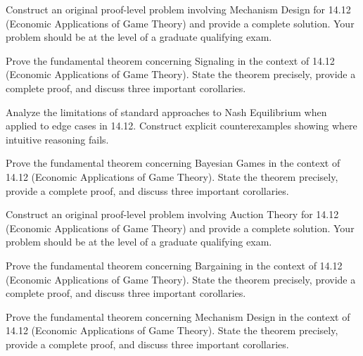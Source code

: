 \documentclass[12pt,a4paper]{exam}
\begin{document}
\begin{questions}
\vspace{0.3cm}

\question[3]
Construct an original proof-level problem involving Mechanism Design for 14.12 (Economic Applications of Game Theory) and provide a complete solution. Your problem should be at the level of a graduate qualifying exam.

\vspace{0.3cm}

\question[2]
Prove the fundamental theorem concerning Signaling in the context of 14.12 (Economic Applications of Game Theory). State the theorem precisely, provide a complete proof, and discuss three important corollaries.

\vspace{0.3cm}

\question[3]
Analyze the limitations of standard approaches to Nash Equilibrium when applied to edge cases in 14.12. Construct explicit counterexamples showing where intuitive reasoning fails.

\vspace{0.3cm}

\question[6]
Prove the fundamental theorem concerning Bayesian Games in the context of 14.12 (Economic Applications of Game Theory). State the theorem precisely, provide a complete proof, and discuss three important corollaries.

\vspace{0.3cm}

\question[5]
Construct an original proof-level problem involving Auction Theory for 14.12 (Economic Applications of Game Theory) and provide a complete solution. Your problem should be at the level of a graduate qualifying exam.

\vspace{0.3cm}

\question[5]
Prove the fundamental theorem concerning Bargaining in the context of 14.12 (Economic Applications of Game Theory). State the theorem precisely, provide a complete proof, and discuss three important corollaries.

\vspace{0.3cm}

\question[2]
Prove the fundamental theorem concerning Mechanism Design in the context of 14.12 (Economic Applications of Game Theory). State the theorem precisely, provide a complete proof, and discuss three important corollaries.

\vspace{0.3cm}


\end{questions}
\end{document}
